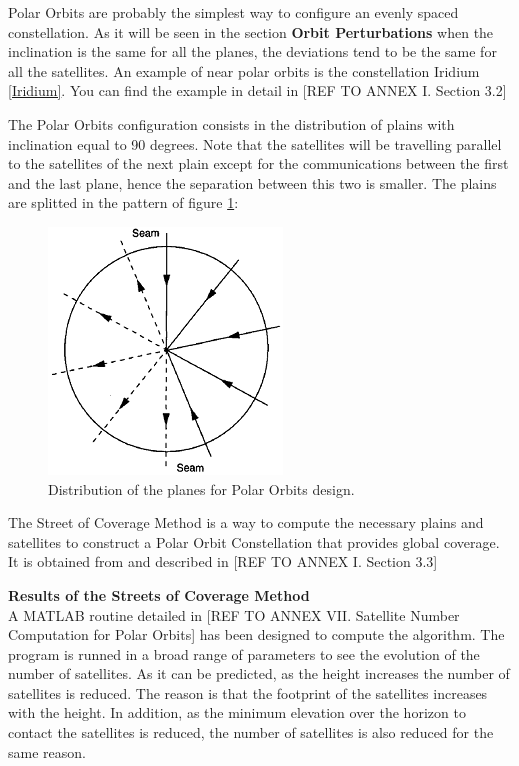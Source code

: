 Polar Orbits are probably the simplest way to configure an evenly spaced constellation. As it will be seen in the section \textbf{Orbit Perturbations} when the inclination is the same for all the planes, the deviations tend to be the same for all the satellites. An example of near polar orbits is the constellation Iridium \ref{Iridium}. You can find the example in detail in [{REF TO ANNEX I. Section 3.2}]

\begin{minipage}{0.45\textwidth}
The Polar Orbits configuration consists in the distribution of plains with inclination equal to 90 degrees. Note that the satellites will be travelling parallel to the satellites of the next plain except for the communications between the first and the last plane, hence the separation between this two is smaller. The plains are splitted in the pattern of figure \ref{fig:polardist}:
\end{minipage}
\vline
\begin{minipage}{0.45\textwidth}
\begin{figure}[H]
\begin{center}
\includegraphics[scale=0.40]{PolarOrbits/planeconfig.png}
\caption{Distribution of the planes for Polar Orbits design.}
\label{fig:polardist}
\end{center}
\end{figure}

\end{minipage}

The Street of Coverage Method is a way to compute the necessary plains and satellites to construct a Polar Orbit Constellation that provides global coverage. It is obtained from 
\cite{Chobotov2002} and described in 
[{REF TO ANNEX I. Section 3.3}]

\textbf{Results of the Streets of Coverage Method\\}
A MATLAB routine detailed in [{REF TO ANNEX VII. Satellite Number Computation for Polar Orbits}] has been designed to compute the  algorithm. The program is runned in a broad range of parameters to see the evolution of the number of satellites. As it can be predicted, as the height increases the number of satellites is reduced. The reason is that the footprint of the satellites increases with the height. In addition, as the minimum elevation over the horizon to contact the satellites is reduced, the number of satellites is also reduced for the same reason. 

